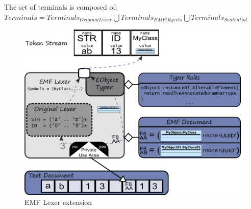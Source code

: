 The set of terminals is composed of: \\
$Terminals = Terminals_{OriginalLexer} \bigcup Terminals_{EMFObjects} \bigcup Terminals_{Sentential} \label{TotalTerminals}$

\begin{figure}
\centering
\includegraphics[scale=0.61]{gfx/ex/Lexer} 
\caption{EMF Lexer extension}
\label{EMFLexer}
\end{figure}
